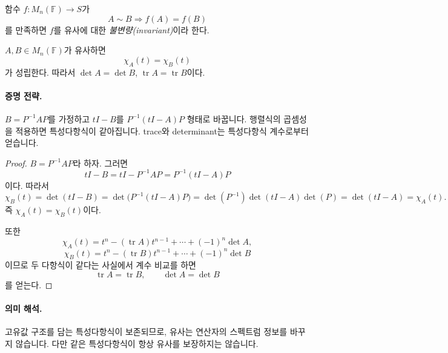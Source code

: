 
\begin{definition}
함수 $f:M_n(\mathbb F)\to S$가
$$
A\sim B \Longrightarrow f(A)=f(B)
$$
를 만족하면 $f$를 유사에 대한 \emph{불변량(invariant)}이라 한다.
\end{definition}

\begin{theorem}
$A,B\in M_n(\mathbb F)$가 유사하면
$$
\chi_A(t)=\chi_B(t)
$$
가 성립한다. 따라서 $\det A=\det B$, $\operatorname{tr}A=\operatorname{tr}B$이다.
\end{theorem}

\paragraph{증명 전략.}
$B=P^{-1}AP$를 가정하고 $tI-B$를 $P^{-1}(tI-A)P$ 형태로 바꿉니다. 행렬식의 곱셈성을 적용하면 특성다항식이 같아집니다. trace와 determinant는 특성다항식 계수로부터 얻습니다.

\begin{proof}
$B=P^{-1}AP$라 하자. 그러면
$$
tI-B=tI-P^{-1}AP=P^{-1}(tI-A)P
$$
이다. 따라서
$$
\chi_B(t)=\det(tI-B)
=\det\!\big(P^{-1}(tI-A)P\big)
=\det(P^{-1})\det(tI-A)\det(P)
=\det(tI-A)
=\chi_A(t).
$$
즉 $\chi_A(t)=\chi_B(t)$이다.

또한
$$
\chi_A(t)=t^n-(\operatorname{tr}A)t^{n-1}+\cdots+(-1)^n\det A,
$$
$$
\chi_B(t)=t^n-(\operatorname{tr}B)t^{n-1}+\cdots+(-1)^n\det B
$$
이므로 두 다항식이 같다는 사실에서 계수 비교를 하면
$$
\operatorname{tr}A=\operatorname{tr}B,\qquad \det A=\det B
$$
를 얻는다.
\end{proof}

\paragraph{의미 해석.}
고유값 구조를 담는 특성다항식이 보존되므로, 유사는 연산자의 스펙트럼 정보를 바꾸지 않습니다. 다만 같은 특성다항식이 항상 유사를 보장하지는 않습니다.

